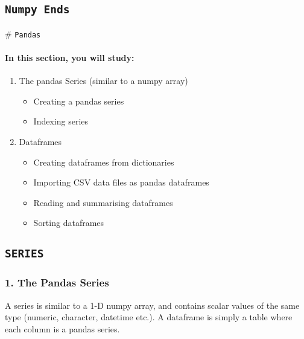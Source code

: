 \documentclass[11pt]{article}
\providecommand{\tightlist}{%
      \setlength{\itemsep}{0pt}\setlength{\parskip}{0pt}}
\begin{document}
    \hypertarget{numpy-ends}{%
\subsection{\texorpdfstring{\texttt{Numpy\ Ends}}{Numpy Ends}}\label{numpy-ends}}

     \# \texttt{Pandas}

    \hypertarget{in-this-section-you-will-study}{%
\paragraph{In this section, you will
study:}\label{in-this-section-you-will-study}}

\begin{enumerate}
\def\labelenumi{\arabic{enumi}.}
\tightlist
\item
  The pandas Series (similar to a numpy array)

  \begin{itemize}
  \tightlist
  \item
    Creating a pandas series
  \item
    Indexing series
  \end{itemize}
\item
  Dataframes

  \begin{itemize}
  \tightlist
  \item
    Creating dataframes from dictionaries
  \item
    Importing CSV data files as pandas dataframes
  \item
    Reading and summarising dataframes
  \item
    Sorting dataframes
  \end{itemize}
\end{enumerate}

    \hypertarget{series}{%
\subsection{\texorpdfstring{\texttt{SERIES}}{SERIES}}\label{series}}

\hypertarget{the-pandas-series}{%
\subsubsection{1. The Pandas Series}\label{the-pandas-series}}

A series is similar to a 1-D numpy array, and contains scalar values of
the same type (numeric, character, datetime etc.). A dataframe is simply
a table where each column is a pandas series.
\end{document}
